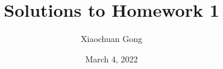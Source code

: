 
\documentclass[11pt]{article}
\usepackage{amsmath,amssymb,amsthm,latexsym}
\usepackage{mathrsfs,mathtools}
\usepackage{graphicx}
\usepackage{comment}
\usepackage{bm}
\usepackage{natbib}
\usepackage{subfigure,multirow}
\usepackage[colorlinks,linkcolor=black,citecolor=black,urlcolor=black]{hyperref}
\usepackage{verbatim}

\renewcommand\baselinestretch{1.25}
\topmargin -.5in
\textheight 9in
\textwidth 6.6in
\oddsidemargin -.25in
\evensidemargin -.25in

\title{Solutions to Homework 1}
\author{Xiaochuan Gong}
\date{March 4, 2022}


\maketitle %

\subsection*{Problem 1}
\textbf{(The Courant-Fischer Theorem for Singular Values).} Suppose $A ^{m\times n}$ has sigular values $\sigma_1,\dots, \sigma_n$ ordered so that $\sigma_1\geq \sigma_2\geq \dots \geq \sigma_n$. Then for $k=1,\dots,n$:

\noindent(1)$\sigma_k=\max \limits_{S\subseteq R^n,dim(S)=k}\ \min \limits_{v,||v||=1,v\in S} ||Av||,$


